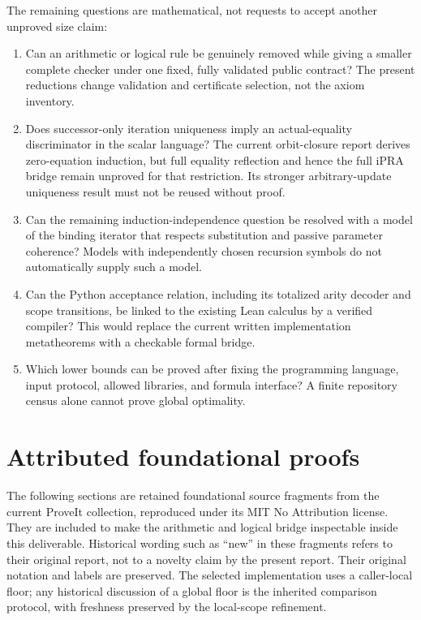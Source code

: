 \documentclass[11pt]{article}
\theoremstyle{definition}\newtheorem{definition}[theorem]{Definition}
\theoremstyle{remark}\newtheorem{remark}[theorem]{Remark}
\begin{document}
The remaining questions are mathematical, not requests to accept another
unproved size claim:
\begin{enumerate}
\item Can an arithmetic or logical rule be genuinely removed while giving
a smaller complete checker under one fixed, fully validated public
contract? The present reductions change validation and certificate
selection, not the axiom inventory.
\item Does successor-only iteration uniqueness imply an actual-equality
discriminator in the scalar language? The current orbit-closure report
derives zero-equation induction, but full equality reflection and hence
the full iPRA bridge remain unproved for that restriction. Its stronger
arbitrary-update uniqueness result must not be reused without proof.
\item Can the remaining induction-independence question be resolved with
a model of the binding iterator that respects substitution and passive
parameter coherence? Models with independently chosen recursion symbols
do not automatically supply such a model.
\item Can the Python acceptance relation, including its totalized arity
decoder and scope transitions, be linked to the existing Lean calculus
by a verified compiler? This would replace the current written
implementation metatheorems with a checkable formal bridge.
\item Which lower bounds can be proved after fixing the programming
language, input protocol, allowed libraries, and formula interface? A
finite repository census alone cannot prove global optimality.
\end{enumerate}

\clearpage
\appendix
\section*{Attributed foundational proofs}
The following sections are retained foundational source fragments from the
current ProveIt collection, reproduced under its MIT No Attribution license.
They are included to make the arithmetic and logical bridge inspectable
inside this deliverable. Historical wording such as ``new'' in these
fragments refers to their original report, not to a novelty claim by the
present report. Their original notation and labels are preserved. The
selected implementation uses a caller-local floor; any historical discussion
of a global floor is the inherited comparison protocol, with freshness
preserved by the local-scope refinement.
\end{document}
